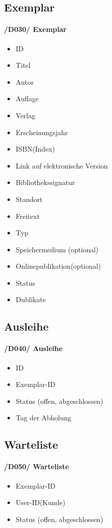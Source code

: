 \documentclass{article}
\begin{document}
\begin{itemize}
	\subsection{Exemplar}
	\label{D030} \paragraph{/D030/ Exemplar}
	\begin{itemize}
	    \item ID
	    \item Titel
	    \item Autor
	    \item Auflage
	    \item Verlag
	    \item Erscheinungsjahr
	    \item ISBN(Index)
	    \item Link auf elektronische Version
	    \item Bibliothekssignatur
	    \item Standort
	    \item Freitext
	    \item Typ
	    \item Speichermedium (optional)
	    \item Onlinepublikation(optional)
	    \item Status
	    \item Dublikate
	   	\end{itemize}
	   	
\subsection{Ausleihe}
	\label{D040} \paragraph{/D040/ Ausleihe}
	\begin{itemize}
	\item ID
	\item Exemplar-ID
	\item Status (offen, abgeschlossen)
	\item Tag der Abholung
	\end{itemize}
	
	
\subsection{Warteliste}
	\label{D050} \paragraph{/D050/ Warteliste}
	\begin{itemize}
	\item Exemplar-ID
	\item User-ID(Kunde)
	\item Status (offen, abgeschlossen)

	\end{itemize}	
	\end{itemize}	
\end{document}
